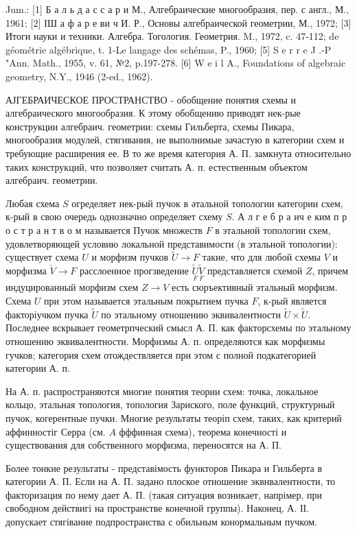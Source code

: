 \documentclass[10pt]{article}
\begin{document}
Jum.: [1] Б а л ь д а с с а р и М., Алгебраические многообразия, пер. с англ., М., 1961; [2] IШ а ф а р е ви ч И. Р., Основы алгебраической геометрии, М., 1972; [3] Итоги науки и техники. Алгебра. Тогология. Геометрия. M., 1972, c. 47-112; de géométrie algébrique, t. 1-Le langage des schémas, P., 1960; [5] S e r r e J .-P "Ann. Math., 1955, v. 61, №2, p.197-278. [6] W e i l A., Foundations of algebraic geometry, N.Y., 1946 (2-ed., 1962).



АЈГЕБРАИЧЕСКОЕ ПРОСТРАНСТВО - обобщение понятия схемы и алгебраического многообразия. К этому обобщению приводят нек-рые конструкции алгебраич. геометрии: схемы Гильберта, схемы Пикара, многообразия модулей, стягивания, не выполнимые зачастую в категории схем и требующие расширения ее. В то же время категория А. П. замкнута относительно таких конструкций, что позволяет считать А. п. естественным объектом алгебраич. геометрии.



Любая схема $S$ огределяет нек-рый пучок в әтальной топологии категории схем, к-рый в свою очередь однозначно определяет схему $S$. А л г е б р а ич е ким п р о с т р а н т в о м называется Пучок множеств $F$ в этальной топологии схем, удовлетворяющей условию локальной представимости (в этальной топологии): существует схема $U$ и морфизм пучков $\tilde{U} \rightarrow F$ такие, что для любой схемы $V$ и морфизма $\check{V} \rightarrow F$ расслоенное прогзведение $\underset{F}{\tilde{U}} \underset{F}{\tilde{V}}$ представляется схемой $Z$, причем индуцированный морфизм схем $Z \rightarrow V$ есть сюръективный этальный морфизм. Схема $U$ при этом называется этальным покрытием пучка $F$, к-рый является факторіучком пучка $\tilde{U}$ по этальному отношению эквивалентности $\tilde{U} \times \tilde{U}$. Последнее вскрывает геометрпческий смысл А. П. как факторсхемы по этальному отношению эквивалентности. Морфизмы А. п. определяются как морфизмы гучков; категория схем отождествляется при этом с полной подкатегорией категории А. п.



На А. п. распространяются многие понятия теории схем: точка, локальное кольцо, этальная топология, топология Зариского, поле функций, структурный пучок, когерентные пучки. Многие результаты теоріп схем, таких, как критерий аффинностіг Серра (см. $A$ фффинная схема), теорема конечності и существования для собственного морфизма, переносятся на А. П.



Более тонкие результаты - представімость функторов Пикара и Гильберта в категории А. П. Если на А. П. задано плоское отношение эквнвалентности, то факторизация по нему дает А. П. (такая ситуация возникает, напрімер, при свободном действигі на пространстве конечной группы). Наконец, А. ІІ. допускает стягівание подпространства с обильным конормальным пучком.
\end{document}
